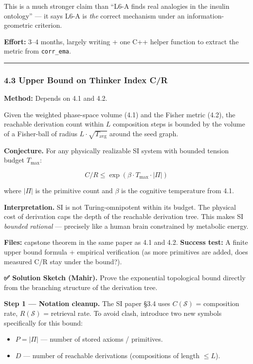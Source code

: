 \documentclass[
  11pt,
  a4paper,
]{article}
\providecommand{\tightlist}{%
  \setlength{\itemsep}{0pt}\setlength{\parskip}{0pt}}
\begin{document}
This is a much stronger claim than ``L6-A finds real analogies in the
insulin ontology'' --- it says L6-A is \emph{the} correct mechanism
under an information-geometric criterion.

\textbf{Effort:} 3--4 months, largely writing + one C++ helper function
to extract the metric from \texttt{corr\_ema}.

\begin{center}\rule{0.5\linewidth}{0.5pt}\end{center}

\subsubsection{4.3 Upper Bound on Thinker Index
C/R}\label{upper-bound-on-thinker-index-cr}

\textbf{Method:} Depends on 4.1 and 4.2.

Given the weighted phase-space volume (4.1) and the Fisher metric (4.2),
the reachable derivation count within \(L\) composition steps is bounded
by the volume of a Fisher-ball of radius \(L \cdot \sqrt{T_\text{avg}}\)
around the seed graph.

\textbf{Conjecture.} For any physically realizable SI system with
bounded tension budget \(T_\text{max}\):

\[
C/R \leq \exp(\beta \cdot T_\text{max} \cdot |\Pi|)
\]

where \(|\Pi|\) is the primitive count and \(\beta\) is the cognitive
temperature from 4.1.

\textbf{Interpretation.} SI is not Turing-omnipotent within its budget.
The physical cost of derivation caps the depth of the reachable
derivation tree. This makes SI \emph{bounded rational} --- precisely
like a human brain constrained by metabolic energy.

\textbf{Files:} capstone theorem in the same paper as 4.1 and 4.2.
\textbf{Success test:} A finite upper bound formula + empirical
verification (as more primitives are added, does measured C/R stay under
the bound?).

\textbf{✅ Solution Sketch (Mahir).} Prove the exponential topological
bound directly from the branching structure of the derivation tree.

\textbf{Step 1 --- Notation cleanup.} The SI paper §3.4 uses
\(C(\mathcal{S})\) = composition rate, \(R(\mathcal{S})\) = retrieval
rate. To avoid clash, introduce two new symbols specifically for this
bound:

\begin{itemize}
\tightlist
\item
  \(P = |\Pi|\) --- number of stored axioms / primitives.
\item
  \(D\) --- number of reachable derivations (compositions of length
  \(\leq L\)).
\end{itemize}
\end{document}
